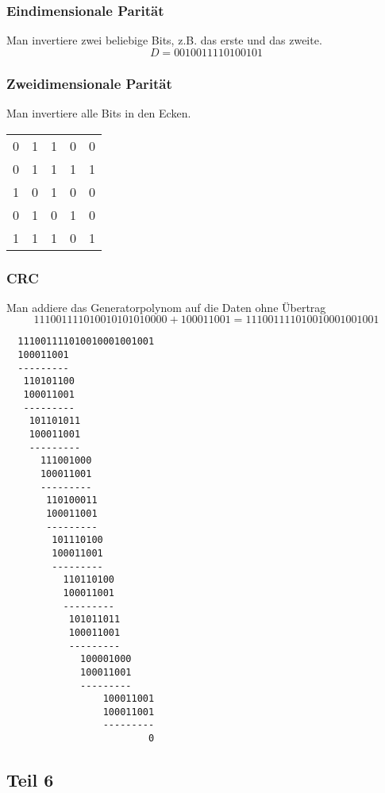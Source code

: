 \documentclass[10pt,a4paper]{article}
\begin{document}
\subsubsection{Eindimensionale Parität}

Man invertiere zwei beliebige Bits, z.B. das erste und das zweite.
\begin{equation}
  D = 0010011110100101
\end{equation}

\subsubsection{Zweidimensionale Parität}

Man invertiere alle Bits in den Ecken.
\begin{tabular}{cccc|c}
  0 & 1 & 1 & 0 & 0\\
  0 & 1 & 1 & 1 & 1\\
  1 & 0 & 1 & 0 & 0\\
  0 & 1 & 0 & 1 & 0\\\hline
  1 & 1 & 1 & 0 & 1
\end{tabular}

\subsubsection{CRC}

Man addiere das Generatorpolynom auf die Daten ohne Übertrag
\begin{equation}
  111001111010010101010000 + 100011001 = 111001111010010001001001
\end{equation}
\begin{verbatim}
  111001111010010001001001
  100011001
  ---------
   110101100
   100011001
   ---------
    101101011
    100011001
    ---------
      111001000
      100011001
      ---------
       110100011
       100011001
       ---------
        101110100
        100011001
        ---------
          110110100
          100011001
          ---------
           101011011
           100011001
           ---------
             100001000
             100011001
             ---------
                 100011001
                 100011001
                 ---------
                         0
\end{verbatim}

\subsection{Teil 6}
\end{document}
